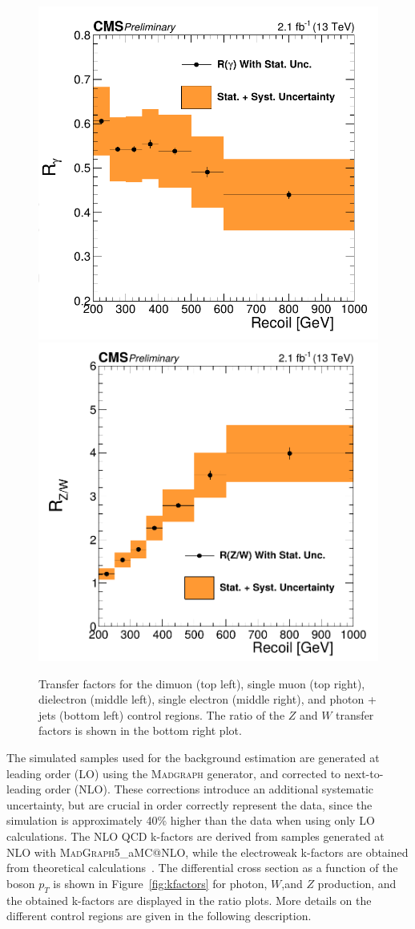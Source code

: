\begin{figure}[h!]
 \vspace{.2cm}
 \includegraphics[width=.49\textwidth]{gamma_TF.png} 
 \includegraphics[width=.5\textwidth]{ZW_ratio.png} 
 \caption{Transfer factors for the dimuon (top left), single muon (top right), dielectron (middle left), single electron (middle right), and photon + jets (bottom left) control regions. The ratio of the $Z$ and $W$ transfer factors is shown in the bottom right plot.}
 \label{fig:TF}
\end{figure}

The simulated samples used for the background estimation are generated at leading order (LO) using the \textsc{Madgraph} generator, and corrected to next-to-leading order (NLO). These corrections introduce an additional systematic uncertainty, but are crucial in order correctly represent the data, since the simulation is approximately 40\% higher than the data when using only LO calculations. The NLO QCD k-factors are derived from samples generated at NLO with \textsc{MadGraph5\_}a\textsc{MC@NLO}, while the electroweak k-factors are obtained from theoretical calculations~\cite{Kuhn:2005gv, Kallweit:2015fta, Kallweit:2014xda, Kallweit:2015dum}. The differential cross section as a function of the boson $p_T$ is shown in Figure~\ref{fig:kfactors} for photon, $W$,and $Z$ production, and the obtained k-factors are displayed in the ratio plots. More details on the different control regions are given in the following description.

